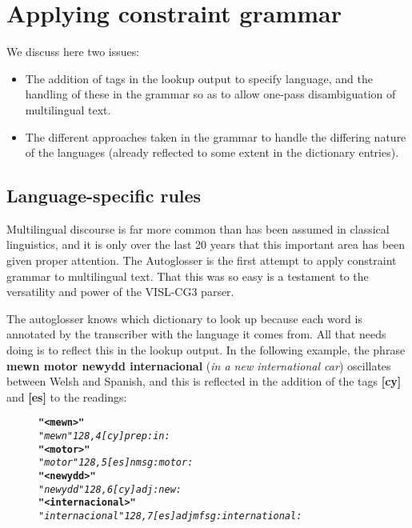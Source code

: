 \documentclass[11pt]{article}
\begin{document}
\section{Applying constraint grammar}
\label{sec:constraint}

We discuss here two issues:
\begin{itemize}
\item The addition of tags in the lookup output to specify language, and the handling of these in the grammar so as to allow one-pass disambiguation of multilingual text.
\item The different approaches taken in the grammar to handle the differing nature of the languages (already reflected to some extent in the dictionary entries).
\end{itemize}

\subsection{Language-specific rules}
\label{sec:langspec}

Multilingual discourse is far more common than has been assumed in classical linguistics, and it is only over the last 20 years that this important area has been given proper attention.  The Autoglosser is the first attempt to apply constraint grammar to multilingual text.  That this was so easy is a testament to the versatility and power of the VISL-CG3 parser.

The autoglosser knows which dictionary to look up because each word is annotated by the transcriber with the language it comes from.  All that needs doing is to reflect this in the lookup output.  In the following example, the phrase \textbf{mewn motor newydd internacional} (\textit{in a new international car}) oscillates between Welsh and Spanish, and this is reflected in the addition of the tags \textbf{[cy]} and \textbf{[es]} to the readings:

\begin{figure}[!htbp]
\vspace{-10pt}
\begin{alltt}
\normalfont
\textbf{"<mewn>"}
    \textit{"mewn" {128,4} [cy] prep :in:}
\textbf{"<motor>"}
    \textit{"motor" {128,5} [es] n m sg :motor:}
\textbf{"<newydd>"}
    \textit{"newydd" {128,6} [cy] adj :new:}
\textbf{"<internacional>"}
    \textit{"internacional" {128,7} [es] adj mf sg :internat\-ional:}
\end{alltt}
\vspace{-10pt}
\end{figure}
\end{document}

